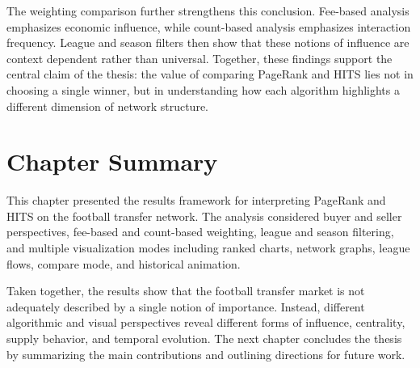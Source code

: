 The weighting comparison further strengthens this conclusion. Fee-based analysis emphasizes economic influence, while count-based analysis emphasizes interaction frequency. League and season filters then show that these notions of influence are context dependent rather than universal. Together, these findings support the central claim of the thesis: the value of comparing PageRank and HITS lies not in choosing a single winner, but in understanding how each algorithm highlights a different dimension of network structure.


\section{Chapter Summary}
\label{sec:results_summary}

This chapter presented the results framework for interpreting PageRank and HITS on the football transfer network. The analysis considered buyer and seller perspectives, fee-based and count-based weighting, league and season filtering, and multiple visualization modes including ranked charts, network graphs, league flows, compare mode, and historical animation.

Taken together, the results show that the football transfer market is not adequately described by a single notion of importance. Instead, different algorithmic and visual perspectives reveal different forms of influence, centrality, supply behavior, and temporal evolution. The next chapter concludes the thesis by summarizing the main contributions and outlining directions for future work.

